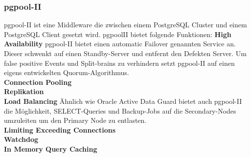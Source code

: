 
\subsubsection{pgpool-II}
pgpool-II ist eine Middleware die zwischen einem \Gls{PostgreSQL Cluster} und einem PostgreSQL Client gesetzt wird.
pgpoolII bietet folgende Funktionen\cite{EXVNLICT,3XWCD3KX}:
\textbf{High Availability}
pgpool-II bietet einen automatic \Gls{Failover} genannten Service an.
Dieser schwenkt auf einen Standby-Server und entfernt den Defekten Server.
Um false positive Events und Split-brains zu verhindern setzt pgpool-II auf einen eigens entwickelten \Gls{Quorum}-Algorithmus.
\\\textbf{Connection Pooling}
\\\textbf{Replikation}
\\\textbf{Load Balancing}
Ähnlich wie Oracle Active Data Guard \cite{6294443C} bietet auch pgpool-II die Möglichkeit, SELECT-Queries und Backup-Jobs auf die Secondary-Nodes umzuleiten um den Primary Node zu entlasten.
\\\textbf{Limiting Exceeding Connections}
\\\textbf{Watchdog}
\\\textbf{In Memory Query Caching}
